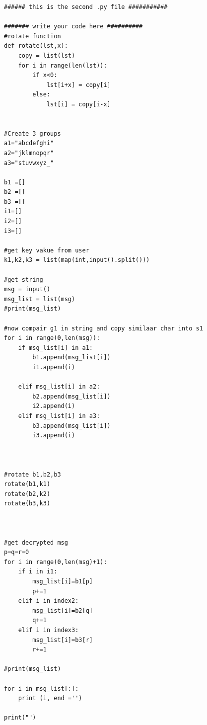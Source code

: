 \documentclass[a4paper,12pt]{article}
\begin{document}




\begin{lstlisting}[style=CStyle]
###### this is the second .py file ###########

####### write your code here ##########
#rotate function
def rotate(lst,x):
    copy = list(lst)
    for i in range(len(lst)):
        if x<0:
            lst[i+x] = copy[i]
        else:
            lst[i] = copy[i-x]


#Create 3 groups
a1="abcdefghi"
a2="jklmnopqr"
a3="stuvwxyz_"

b1 =[]
b2 =[]
b3 =[]
i1=[]
i2=[]
i3=[]

#get key vakue from user
k1,k2,k3 = list(map(int,input().split()))

#get string
msg = input()
msg_list = list(msg)
#print(msg_list)

#now compair g1 in string and copy similaar char into s1
for i in range(0,len(msg)):
	if msg_list[i] in a1:
		b1.append(msg_list[i])
		i1.append(i)
		
	elif msg_list[i] in a2:
	    b2.append(msg_list[i])
	    i2.append(i)
	elif msg_list[i] in a3:
	    b3.append(msg_list[i]) 
	    i3.append(i)



#rotate b1,b2,b3
rotate(b1,k1)
rotate(b2,k2)
rotate(b3,k3)



#get decrypted msg
p=q=r=0
for i in range(0,len(msg)+1):
	if i in i1:
		msg_list[i]=b1[p]
		p+=1
	elif i in index2:
		msg_list[i]=b2[q]
		q+=1
	elif i in index3:
		msg_list[i]=b3[r]
		r+=1	

#print(msg_list)

for i in msg_list[:]:
	print (i, end ='')

print("")
\end{lstlisting}

\nocite{*}


\end{document}
